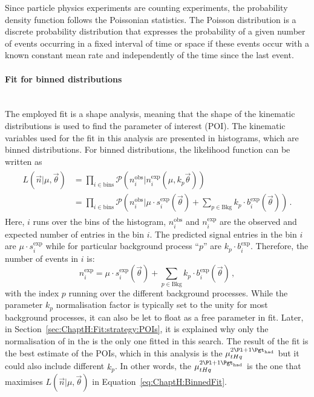 Since particle physics experiments are counting experiments, the probability density function follows 
the Poissonian statistics. The Poisson distribution is a discrete probability distribution 
that expresses the probability of a given number of events occurring in a fixed interval 
of time or space if these events occur with a known constant mean rate and independently 
of the time since the last event. 



\paragraph{Fit for binned distributions}\mbox{}\\
The employed fit is a shape analysis, meaning that the
shape of the kinematic distributions is used to find the parameter of interest (POI).
The kinematic variables used for the fit in this analysis are presented in histograms, 
which are binned distributions.
For binned distributions, the likelihood function can be written as
\begin{align}\label{eq:ChaptH:BinnedFit}
\begin{split}
	L(\overrightarrow{n}|\mu, \overrightarrow{\theta}) 
	& = \prod_{i \in \text{bins}} \mathcal{P}(n_{i}^{\text{obs}} | n_{i}^{\text{exp}}(\mu, k_{p} \overrightarrow{\theta})) \\
	& = \prod_{i \in \text{bins}} \mathcal{P}(n_{i}^{\text{obs}} | \mu \cdot s_{i}^{\text{exp}}(\overrightarrow{\theta}) + \sum_{p \in \text{Bkg}} k_{p} \cdot b_{i}^{\text{exp}}(\overrightarrow{\theta}))\, .
\end{split}
\end{align}
Here, $i$ runs over the bins of the histogram, $n_{i}^{\text{obs}}$ and $n_{i}^{\text{exp}}$ are the observed 
and expected number of entries in the bin $i$. The predicted signal entries in 
the bin $i$ are $\mu \cdot s_{i}^{\text{exp}}$ while for particular background process ``$p$'' are $k_{p} \cdot b_{i}^{\text{exp}}$. 
Therefore, the number of events in $i$ is:
\begin{equation*}
	n_{i}^{\text{exp}} = \mu \cdot s_{i}^{\text{exp}}(\overrightarrow{\theta}) + \sum_{p \in \text{Bkg}} k_{p} \cdot b_{i}^{\text{exp}}(\overrightarrow{\theta}) \, ,
\end{equation*}
with the index $p$ running over the different background processes. While the 
parameter $k_{p}$ normalisation factor is typically set to the unity 
for most background processes, it can also be let to float as a free parameter in fit. Later, 
in Section~\ref{sec:ChaptH:Fit:strategy:POIs}, it is explained why only the normalisation of \ttW in the \dilepSStau 
is the only one fitted in this search. 
The result of the fit is the best estimate of the POIs, which in this analysis is the $\mu_{\tHq}^{\dileptau}$ but it
could also include different $k_{p}$.
In other words, the $\mu_{\tHq}^{\dileptau}$ is the one that maximises 
$L(\overrightarrow{n}| \mu, \overrightarrow{\theta})$ in Equation~\ref{eq:ChaptH:BinnedFit}.

